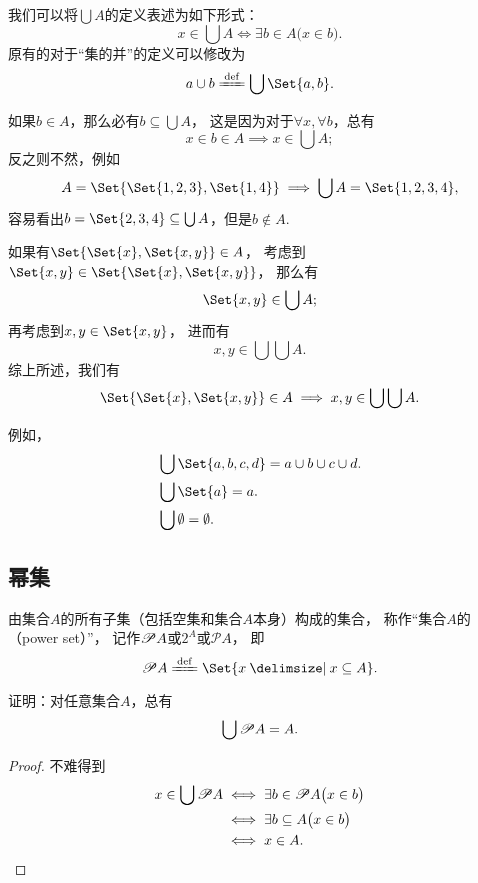我们可以将\(\bigcup A\)的定义表述为如下形式：\[
	x \in \bigcup A
	\iff
	\exists b \in A \bigl( x \in b \bigr).
\]
原有的对于“集的并”的定义可以修改为\[
	a \cup b \defeq \bigcup\Set{a,b}.
\]

\begin{example}
如果\(b \in A\)，那么必有\(b \subseteq \bigcup A\)，
这是因为对于\(\forall x, \forall b\)，总有\[
	x \in b \in A
	\implies
	x \in \bigcup A;
\]
反之则不然，例如\[
	A = \Set{\Set{1,2,3},\Set{1,4}}
	\implies
	\bigcup A = \Set{1,2,3,4},
\]
容易看出\(b = \Set{2,3,4} \subseteq \bigcup A\)，但是\(b \notin A\).
\end{example}

\begin{example}\label{example:集合论.有序对各坐标的取值范围}
如果有\(\Set{ \Set{x}, \Set{x,y} } \in A\)，
考虑到\(\Set{x,y} \in \Set{ \Set{x}, \Set{x,y} }\)，
那么有\[
	\Set{x,y} \in \bigcup A;
\]
再考虑到\(x,y \in \Set{x,y}\)，
进而有\[
	x,y \in \bigcup\bigcup A.
\]
综上所述，我们有
\begin{equation}
	\Set{ \Set{x}, \Set{x,y} } \in A
	\implies
	x,y \in \bigcup\bigcup A.
\end{equation}
\end{example}

例如，
\begin{align*}
	&\bigcup\Set{a,b,c,d} = a \cup b \cup c \cup d. \\
	&\bigcup\Set{a} = a. \\
	&\bigcup\emptyset = \emptyset.
\end{align*}


\subsection{幂集}
\begin{definition}
由集合\(A\)的所有子集（包括空集和集合\(A\)本身）构成的集合，
称作“集合\(A\)的（power set）”，
记作\(\mathscr{P} A\)或\(2^A\)或\(\mathcal{P}A\)，
即\[
	\Powerset A
	\defeq
	\Set{ x \given x \subseteq A }.
\]
\end{definition}

\begin{example}
证明：对任意集合\(A\)，总有
\begin{equation}\label{equation:集合论.集的幂集的并等于集}
	\bigcup \mathscr{P} A = A.
\end{equation}
\begin{proof}
不难得到
\begin{align*}
	x \in \bigcup \mathscr{P} A
	&\iff
	\exists b \in \mathscr{P} A \bigl( x \in b \bigr) \\
	&\iff
	\exists b \subseteq A \bigl( x \in b \bigr) \\
	&\iff
	x \in A.
	\qedhere
\end{align*}
\end{proof}
\end{example}

